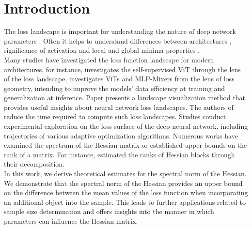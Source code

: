 \documentclass[conference]{IEEEtran}
\begin{document}

\section{Introduction}\label{sec:intro}

The loss landscape is important for understanding the nature of deep network parameters \cite{shinshilla, relevance, ordering}. Often it helps to understand differences between architectures \cite{loss-landscape, skip-conn-landscape}, significance of activation \cite{Bosman_2023} and local and global minima properties \cite{BOSMAN2020113, neyshabur2018the, improved_analysis_trianing}. \\
Many studies have investigated the loss function landscape for modern architectures, for instance, \cite{lee2024visualizinglosslandscapeselfsupervised} investigates the self-supervised ViT through the lens of the loss landscape, \cite{chen2022visiontransformersoutperformresnets} investigates ViTs and MLP-Mixers from the lens of loss geometry, intending to improve the models’ data efficiency at training and generalization at inference. Paper \cite{elhamod2023neurovisualizerautoencoderbasedlosslandscape} presents a landscape visualization
method that provides useful insights about neural network loss landscapes. The authors of \cite{bain2021visualizinglosslandscapewinning} reduce the time required to compute such loss landscapes. Studies \cite{Exp_explor_loss_surface, im2017empiricalanalysisoptimizationdeep} conduct experimental exploration on the loss surface of the deep neural network, including trajectories of various adaptive optimization algorithms. Numerous works have examined the spectrum of the Hessian matrix \cite{investigation_neural_net_eigen, full_spec_hess, liao2021hessianeigenspectrarealisticnonlinear} or established upper bounds on the rank of a matrix. For instance, \cite{singh2023hessianperspectivenatureconvolutional} estimated the ranks of Hessian blocks through their decomposition.  \\
In this work, we derive theoretical estimates for the spectral norm of the Hessian. We demonstrate that the spectral norm of the Hessian provides an upper bound on the difference between the mean values of the loss function when incorporating an additional object into the sample. This leads to further applications related to sample size determination \cite{sample-size-det} and offers insights into the manner in which parameters can influence the Hessian matrix.
\end{document}
